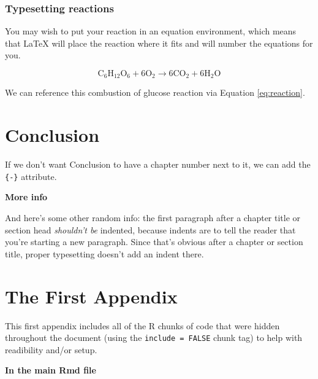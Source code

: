 \documentclass[print]{nuthesis}
\begin{document}
\hypertarget{typesetting-reactions}{%
\subsection{Typesetting reactions}\label{typesetting-reactions}}

You may wish to put your reaction in an equation environment, which means that LaTeX will place the reaction where it fits and will number the equations for you.

\begin{equation}
  \mathrm{C_6H_{12}O_6  + 6O_2} \longrightarrow \mathrm{6CO_2 + 6H_2O}
  \label{eq:reaction}
\end{equation}

We can reference this combustion of glucose reaction via Equation \eqref{eq:reaction}.

\hypertarget{conclusion}{%
\chapter*{Conclusion}\label{conclusion}}

If we don't want Conclusion to have a chapter number next to it, we can add the \texttt{\{-\}} attribute.

\textbf{More info}

And here's some other random info: the first paragraph after a chapter title or section head \emph{shouldn't be} indented, because indents are to tell the reader that you're starting a new paragraph. Since that's obvious after a chapter or section title, proper typesetting doesn't add an indent there.

\appendix

\hypertarget{the-first-appendix}{%
\chapter{The First Appendix}\label{the-first-appendix}}

This first appendix includes all of the R chunks of code that were hidden throughout the document (using the \texttt{include\ =\ FALSE} chunk tag) to help with readibility and/or setup.

\textbf{In the main Rmd file}
\end{document}
